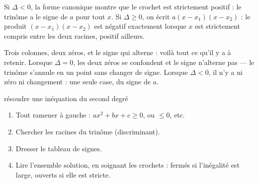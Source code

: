 \begin{demonstration}
Si $\Delta<0$, la forme canonique montre que le crochet est strictement
positif : le trinôme a le signe de $a$ pour tout $x$. Si $\Delta \geq 0$, on
écrit $a(x-x_{1})(x-x_{2})$ : le produit $(x-x_{1})(x-x_{2})$ est négatif
exactement lorsque $x$ est strictement compris entre les deux racines,
positif ailleurs.
\end{demonstration}

\begin{visualisation}
\begin{center}
\end{center}

Trois colonnes, deux zéros, et le signe qui alterne : voilà tout ce qu'il y a
à retenir. Lorsque $\Delta = 0$, les deux zéros se confondent et le signe
n'alterne pas — le trinôme s'annule en un point sans changer de signe.
Lorsque $\Delta < 0$, il n'y a ni zéro ni changement : une seule case, du
signe de $a$.
\end{visualisation}

\begin{methode}{résoudre une inéquation du second degré}
\begin{enumerate}[label=\textbf{\arabic*.}, leftmargin=*, itemsep=0.15em]
  \item Tout ramener à gauche : $ax^{2}+bx+c \geq 0$, ou $\leq 0$, etc.
  \item Chercher les racines du trinôme (discriminant).
  \item Dresser le tableau de signes.
  \item Lire l'ensemble solution, en soignant les crochets : fermés si
        l'inégalité est large, ouverts si elle est stricte.
\end{enumerate}
\end{methode}

